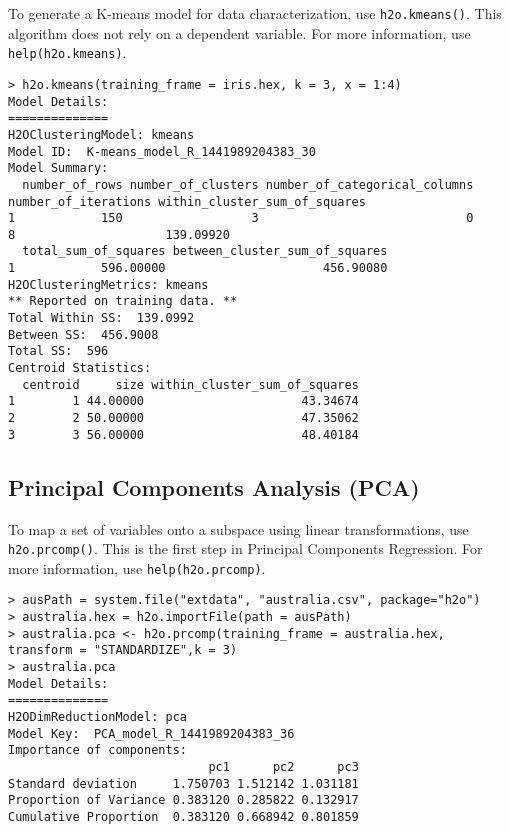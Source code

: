 {{To generate a K-means model for data characterization, use {\texttt{h2o.kmeans()}}. This algorithm does not rely on a dependent variable. For more information, use {\texttt{help(h2o.kmeans)}}.

\waterExampleInR
\medskip
\begin{lstlisting}[style=R]
> h2o.kmeans(training_frame = iris.hex, k = 3, x = 1:4)
Model Details:
==============
H2OClusteringModel: kmeans
Model ID:  K-means_model_R_1441989204383_30 
Model Summary:
  number_of_rows number_of_clusters number_of_categorical_columns number_of_iterations within_cluster_sum_of_squares
1            150                  3                             0                    8                     139.09920
  total_sum_of_squares between_cluster_sum_of_squares
1            596.00000                      456.90080
H2OClusteringMetrics: kmeans
** Reported on training data. **
Total Within SS:  139.0992
Between SS:  456.9008
Total SS:  596 
Centroid Statistics:
  centroid     size within_cluster_sum_of_squares
1        1 44.00000                      43.34674
2        2 50.00000                      47.35062
3        3 56.00000                      48.40184
\end{lstlisting}




\subsection{Principal Components Analysis (PCA)}


To map a set of variables onto a subspace using linear transformations, use {\texttt{h2o.prcomp()}}. This is the first step in Principal Components Regression. For more information, use {\texttt{help(h2o.prcomp)}}.

\waterExampleInR
\medskip
\begin{lstlisting}[style=R]
> ausPath = system.file("extdata", "australia.csv", package="h2o")
> australia.hex = h2o.importFile(path = ausPath)
> australia.pca <- h2o.prcomp(training_frame = australia.hex, transform = "STANDARDIZE",k = 3)
> australia.pca
Model Details:
==============
H2ODimReductionModel: pca
Model Key:  PCA_model_R_1441989204383_36 
Importance of components:
                            pc1      pc2      pc3
Standard deviation     1.750703 1.512142 1.031181
Proportion of Variance 0.383120 0.285822 0.132917
Cumulative Proportion  0.383120 0.668942 0.801859
\end{lstlisting}




}}
